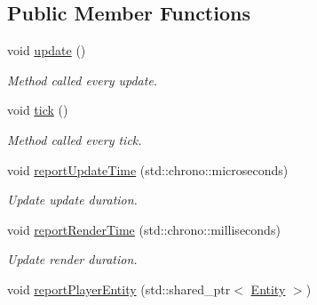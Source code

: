 \subsection*{Public Member Functions}
\begin{DoxyCompactItemize}
\item 
\hypertarget{classDebug_adc0a499f771648251304d4be21893176}{void \hyperlink{classDebug_adc0a499f771648251304d4be21893176}{update} ()}\label{classDebug_adc0a499f771648251304d4be21893176}

\begin{DoxyCompactList}\small\item\em Method called every update. \end{DoxyCompactList}\item 
\hypertarget{classDebug_ac523bb88632b945e48c36e0d1834cfa5}{void \hyperlink{classDebug_ac523bb88632b945e48c36e0d1834cfa5}{tick} ()}\label{classDebug_ac523bb88632b945e48c36e0d1834cfa5}

\begin{DoxyCompactList}\small\item\em Method called every tick. \end{DoxyCompactList}\item 
\hypertarget{classDebug_afe8811f313b908598f9da5a48abdf6d9}{void \hyperlink{classDebug_afe8811f313b908598f9da5a48abdf6d9}{report\-Update\-Time} (std\-::chrono\-::microseconds)}\label{classDebug_afe8811f313b908598f9da5a48abdf6d9}

\begin{DoxyCompactList}\small\item\em Update update duration. \end{DoxyCompactList}\item 
\hypertarget{classDebug_a1e30c7b1d66117085ee8705c5dbe2938}{void \hyperlink{classDebug_a1e30c7b1d66117085ee8705c5dbe2938}{report\-Render\-Time} (std\-::chrono\-::milliseconds)}\label{classDebug_a1e30c7b1d66117085ee8705c5dbe2938}

\begin{DoxyCompactList}\small\item\em Update render duration. \end{DoxyCompactList}\item 
\hypertarget{classDebug_a16c4480a7c46cf2190ad174d38f27c64}{void \hyperlink{classDebug_a16c4480a7c46cf2190ad174d38f27c64}{report\-Player\-Entity} (std\-::shared\-\_\-ptr$<$ \hyperlink{classEntity}{Entity} $>$)}\label{classDebug_a16c4480a7c46cf2190ad174d38f27c64}


\end{DoxyCompactItemize}
